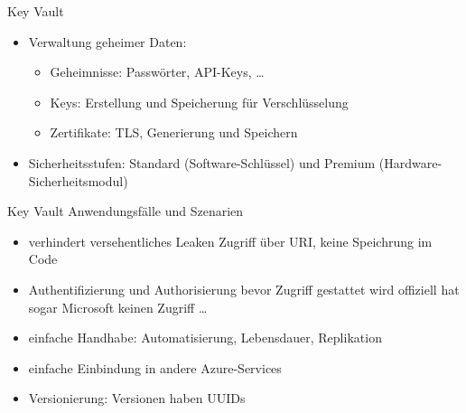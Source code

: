 

\begin{flashcard}[Definition]{Key Vault}
  \begin{itemize}
    \item Verwaltung geheimer Daten:
    \begin{itemize}
      \item Geheimnisse: Passwörter, API-Keys, \ldots
      \item Keys: Erstellung und Speicherung für Verschlüsselung
      \item Zertifikate: TLS, Generierung und Speichern
    \end{itemize}
    \item Sicherheitsstufen: Standard (Software-Schlüssel) und Premium (Hardware-Sicherheitsmodul)
  \end{itemize}
\end{flashcard}

\begin{flashcard}[Definition]{Key Vault Anwendungsfälle und Szenarien}
  \begin{itemize}
    \item verhindert versehentliches Leaken\newline
      Zugriff über URI, keine Speichrung im Code
    \item Authentifizierung und Authorisierung bevor Zugriff gestattet wird\newline
      offiziell hat sogar Microsoft keinen Zugriff \ldots
    \item einfache Handhabe: Automatisierung, Lebensdauer, Replikation
    \item einfache Einbindung in andere Azure-Services
    \item Versionierung: Versionen haben UUIDs
  \end{itemize}
\end{flashcard}

